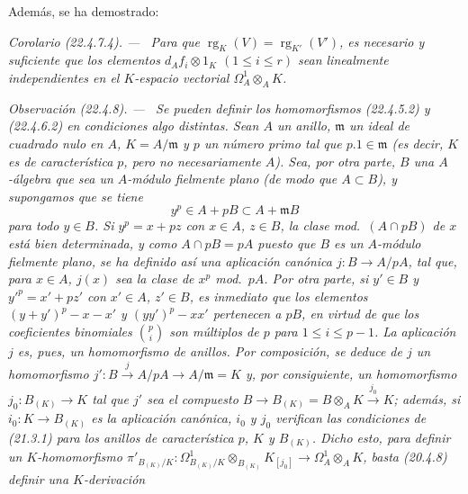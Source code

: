 \documentclass[10pt,oneside]{book}
\makeatletter
\newcommand{\setmanualcurrentlabel}[1]{\def\@currentlabel{#1}}
\newenvironment{corollary}[1][]{%
  \setmanualcurrentlabel{#1}\par\medskip\noindent\itshape Corolario (#1). ---\ }{\par}
\newenvironment{remark}[1][]{%
  \setmanualcurrentlabel{#1}\par\medskip\noindent\itshape Observación (#1). ---\ }{\par}
\providecommand{\setmin}{-}%
\makeatother
\begin{document}
Además, se ha demostrado:

\begin{corollary}[22.4.7.4]
\label{0.22.4.7.4-es}
Para que $\operatorname{rg}_K(V)=\operatorname{rg}_{K'}(V')$, es necesario y suficiente que los elementos
$d_Af_i\otimes1_K$ $(1\leqslant i\leqslant r)$ sean linealmente
independientes en el $K$-espacio vectorial $\Omega^1_A\otimes_AK$.
\end{corollary}

\begin{remark}[22.4.8]
\label{0.22.4.8-es}
Se pueden definir los homomorfismos (22.4.5.2) y (22.4.6.2) en condiciones
algo distintas. Sean $A$ un anillo, $\mathfrak m$ un ideal \emph{de cuadrado
nulo} en $A$, $K=A/\mathfrak m$ y $p$ un número primo tal que
$p.1\in\mathfrak m$ (es decir, $K$ es de característica $p$, pero no
necesariamente $A$). Sea, por otra parte, $B$ una $A$-álgebra que sea un $A$-módulo
\emph{fielmente plano} (de modo que $A\subset B$), y supongamos que se tiene
\begin{equation}
\label{0.22.4.8.1-es}
  y^p\in A+pB\subset A+\mathfrak mB
  \tag{22.4.8.1}
\end{equation}
para todo $y\in B$. Si $y^p=x+pz$ con $x\in A$, $z\in B$, la \emph{clase}
mod.~$(A\cap pB)$ de $x$ está bien determinada, y como $A\cap pB=pA$ puesto que
$B$ es un $A$-módulo fielmente plano, se ha definido así una aplicación
canónica $j:B\longrightarrow A/pA$, tal que, para $x\in A$, $j(x)$ sea la
clase de $x^p$ mod.~$pA$. Por otra parte, si $y'\in B$ y
$y'^p=x'+pz'$ con $x'\in A$, $z'\in B$, es inmediato que los elementos
$(y+y')^p\setmin x\setmin x'$ y $(yy')^p\setmin xx'$ pertenecen a $pB$, en virtud de que los
coeficientes binomiales $\binom pi$ son múltiplos de $p$ para
$1\leqslant i\leqslant p\setmin 1$. La aplicación $j$ es, pues, un
\emph{homomorfismo de anillos}. Por composición, se deduce de $j$ un
homomorfismo $j':B\xrightarrow{j}A/pA\longrightarrow A/\mathfrak m=K$ y, por
consiguiente, un homomorfismo $j_0:B_{(K)}\longrightarrow K$ tal que $j'$ sea el
compuesto $B\longrightarrow B_{(K)}=B\otimes_AK\xrightarrow{j_0}K$; además,
si $i_0:K\longrightarrow B_{(K)}$ es la aplicación canónica, $i_0$ y $j_0$
verifican las condiciones de (21.3.1) para los anillos \emph{de característica
$p$}, $K$ y $B_{(K)}$. Dicho esto, para definir un $K$-homomorfismo
$\pi'_{B_{(K)}/K}:\Omega^1_{B_{(K)}/K}\otimes_{B_{(K)}}K_{[j_0]}
\longrightarrow\Omega^1_A\otimes_AK$, basta (20.4.8) definir una
$K$-\emph{derivación}
\begin{equation}
\label{0.22.4.8.2-es}

\end{equation}
\end{remark}
\end{document}
